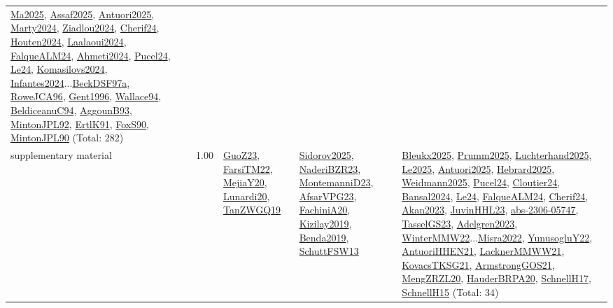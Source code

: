 {\begin{longtable}{p{3cm}r>{\raggedright\arraybackslash}p{6cm}>{\raggedright\arraybackslash}p{6cm}>{\raggedright\arraybackslash}p{8cm}}
\hyperref[detail:Ma2025]{Ma2025}, \hyperref[detail:Assaf2025]{Assaf2025}, \hyperref[detail:Antuori2025]{Antuori2025}, \hyperref[detail:Marty2024]{Marty2024}, \hyperref[detail:Ziadlou2024]{Ziadlou2024}, \hyperref[detail:Cherif24]{Cherif24}, \hyperref[detail:Houten2024]{Houten2024}, \hyperref[detail:Laalaoui2024]{Laalaoui2024}, \hyperref[detail:FalqueALM24]{FalqueALM24}, \hyperref[detail:Ahmeti2024]{Ahmeti2024}, \hyperref[detail:Pucel24]{Pucel24}, \hyperref[detail:Le24]{Le24}, \hyperref[detail:Komasilovs2024]{Komasilovs2024}, \hyperref[detail:Infantes2024]{Infantes2024}...\hyperref[detail:BeckDSF97a]{BeckDSF97a}, \hyperref[detail:RoweJCA96]{RoweJCA96}, \hyperref[detail:Gent1996]{Gent1996}, \hyperref[detail:Wallace94]{Wallace94}, \hyperref[detail:BeldiceanuC94]{BeldiceanuC94}, \hyperref[detail:AggounB93]{AggounB93}, \hyperref[detail:MintonJPL92]{MintonJPL92}, \hyperref[detail:ErtlK91]{ErtlK91}, \hyperref[detail:FoxS90]{FoxS90}, \hyperref[detail:MintonJPL90]{MintonJPL90} (Total: 282)\\
\index{supplementary material}\index{Benchmarks!supplementary material}supplementary material &  1.00 & \hyperref[detail:GuoZ23]{GuoZ23}, \hyperref[detail:FarsiTM22]{FarsiTM22}, \hyperref[detail:MejiaY20]{MejiaY20}, \hyperref[detail:Lunardi20]{Lunardi20}, \hyperref[detail:TanZWGQ19]{TanZWGQ19} & \hyperref[detail:Sidorov2025]{Sidorov2025}, \hyperref[detail:NaderiBZR23]{NaderiBZR23}, \hyperref[detail:MontemanniD23]{MontemanniD23}, \hyperref[detail:AfsarVPG23]{AfsarVPG23}, \hyperref[detail:FachiniA20]{FachiniA20}, \hyperref[detail:Kizilay2019]{Kizilay2019}, \hyperref[detail:Benda2019]{Benda2019}, \hyperref[detail:SchuttFSW13]{SchuttFSW13} & \hyperref[detail:Bleukx2025]{Bleukx2025}, \hyperref[detail:Prumm2025]{Prumm2025}, \hyperref[detail:Luchterhand2025]{Luchterhand2025}, \hyperref[detail:Le2025]{Le2025}, \hyperref[detail:Antuori2025]{Antuori2025}, \hyperref[detail:Hebrard2025]{Hebrard2025}, \hyperref[detail:Weidmann2025]{Weidmann2025}, \hyperref[detail:Pucel24]{Pucel24}, \hyperref[detail:Cloutier24]{Cloutier24}, \hyperref[detail:Bansal2024]{Bansal2024}, \hyperref[detail:Le24]{Le24}, \hyperref[detail:FalqueALM24]{FalqueALM24}, \hyperref[detail:Cherif24]{Cherif24}, \hyperref[detail:Akan2023]{Akan2023}, \hyperref[detail:JuvinHHL23]{JuvinHHL23}, \hyperref[detail:abs-2306-05747]{abs-2306-05747}, \hyperref[detail:TasselGS23]{TasselGS23}, \hyperref[detail:Adelgren2023]{Adelgren2023}, \hyperref[detail:WinterMMW22]{WinterMMW22}...\hyperref[detail:Misra2022]{Misra2022}, \hyperref[detail:YunusogluY22]{YunusogluY22}, \hyperref[detail:AntuoriHHEN21]{AntuoriHHEN21}, \hyperref[detail:LacknerMMWW21]{LacknerMMWW21}, \hyperref[detail:KovacsTKSG21]{KovacsTKSG21}, \hyperref[detail:ArmstrongGOS21]{ArmstrongGOS21}, \hyperref[detail:MengZRZL20]{MengZRZL20}, \hyperref[detail:HauderBRPA20]{HauderBRPA20}, \hyperref[detail:SchnellH17]{SchnellH17}, \hyperref[detail:SchnellH15]{SchnellH15} (Total: 34)\\

\end{longtable}}
